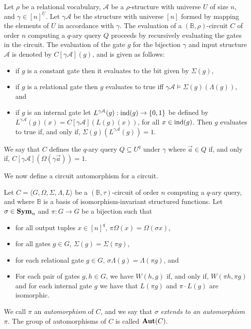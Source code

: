 \documentclass[a4paper,UKenglish]{lipics-v2018}
\begin{document}
Let $\rho$ be a relational vocabulary, $\mathcal{A}$ be a $\rho$-structure with
universe $U$ of size $n$, and $\gamma \in [n]^{\underline{U}}$. Let $\gamma
\mathcal{A}$ be the structure with universe $[n]$ formed by mapping the elements
of $U$ in accordance with $\gamma$. The evaluation of a $(\mathbb{B},
\rho)$-circuit $C$ of order $n$ computing a $q$-ary query $Q$ proceeds by
recursively evaluating the gates in the circuit. The evaluation of the gate $g$
for the bijection $\gamma$ and input structure $\mathcal{A}$ is denoted by
$C[\gamma \mathcal{A}](g)$, and is given as follows:

\begin{itemize}
\item if $g$ is a constant gate then it evaluates to the bit given by
  $\Sigma(g)$,
\item if $g$ is a relational gate then $g$ evaluates to true iff $\gamma
  \mathcal{A} \models \Sigma(g)(\Lambda (g))$, and
\item if $g$ is an internal gate let $L^{\gamma \mathcal{A}}(g): \text{\upshape ind}(g)
  \rightarrow \{0,1\}$ be defined by $L^{\gamma\mathcal{A}}(g)(x) = C[\gamma
  \mathcal{A}](L(g)(x))$, for all $x \in \text{\upshape ind}(g)$. Then $g$ evaluates to true
  if, and only if, $\Sigma(g) (L^{\gamma \mathcal{A}}(g)) = 1$.
\end{itemize}

We say that $C$ defines the $q$-ary query $Q \subseteq U^q$ under $\gamma$ where
$\vec{a} \in Q$ if, and only if, $C[\gamma \mathcal{A}](\Omega (\gamma \vec{a}))
= 1$.

We now define a circuit automorphism for a circuit.

\begin{definition}[Automorphism]\label{defn:automorphism}
  Let $C = \langle G, \Omega, \Sigma, \Lambda, L\rangle$ be a
  $(\mathbb{B},\tau)$-circuit of order $n$ computing a $q$-ary query, and where
  $\mathbb{B}$ is a basis of isomorphism-invariant structured functions. Let
  $\sigma \in \text{\textbf{Sym}}_n$ and $\pi: G \rightarrow G$ be a bijection such that
  \begin{itemize}
  \item for all output tuples $x \in [n]^q$, $\pi \Omega (x) = \Omega (\sigma
    x)$,
  \item for all gates $g \in G$, $\Sigma (g) = \Sigma (\pi g)$,
  \item for each relational gate $g \in G$, $\sigma \Lambda (g) = \Lambda (\pi
    g)$, and
  \item For each pair of gates $g, h \in G$, we have $W(h,g)$ if, and only if,
    $W(\pi h, \pi g)$ and for each internal gate $g$ we have that $L(\pi g)$ and
    $ \pi \cdot L(g)$ are isomorphic.
  \end{itemize}
  We call $\pi$ an \emph{automorphism} of $C$, and we say that $\sigma$
  \emph{extends to an automorphism} $\pi$. The group of automorphisms of $C$ is
  called $\text{\textbf{Aut}} (C)$.
\end{definition}
\end{document}
